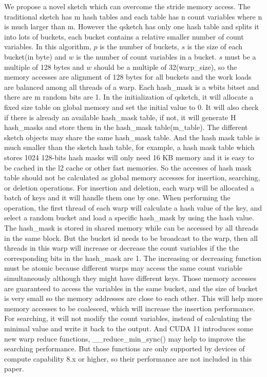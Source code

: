 \documentclass[conference]{IEEEtran}
\begin{document}
We propose a novel sketch which can overcome the stride memory access. The traditional sketch has m hash tables and each table has n count variables where n is much larger than m. However the qsketch has only one hash table and splits it into lots of buckets, each bucket contains a relative smaller number of count variables. In this algorithm, $p$ is the number of buckets, $s$ is the size of each bucket(in byte) and $w$ is the number of count variables in a bucket. $s$ must be a multiple of 128 bytes and $w$ should be a multiple of 32(warp\_size), so the memory accesses are alignment of 128 bytes for all buckets and the work loads are balanced among all threads of a warp. Each hash\_mask is a w\-bits bitset and there are m random bits are 1.
In the initialization of qsketch, it will allocate a fixed size table on global memory and set the initial value to 0. It will also check if there is already an available hash\_mask table, if not, it will generate H hash\_masks and store them in the hash\_mask table(m\_table). The different sketch objects may share the same hash\_mask table. And the hash mask table is much smaller than the sketch hash table, for example, a hash mask table which stores 1024 128-bits hash masks will only need 16 KB memory and it is easy to be cached in the l2 cache or other fast memories. So the accesses of hash mask table should not be calculated as global memory accesses for insertion, searching, or deletion operations.
For insertion and deletion, each warp will be allocated a batch of keys and it will handle them one by one. When performing the operation, the first thread of each warp will calculate a hash value of the key, and select a random bucket and load a specific hash\_mask by using the hash value. The hash\_mask is stored in shared memory while can be accessed by all threads in the same block. But the bucket id needs to be broadcast to the warp, then all threads in this warp will increase or decrease the count variables if the the corresponding bits in the hash\_mask are 1. The increasing or decreasing function must be atomic because different warps may access the same count variable simultaneously although they might have different keys. Those memory accesses are guaranteed to access the variables in the same bucket, and the size of bucket is very small so the memory addresses are close to each other. This will help more memory accesses to be coalesced, which will increase the insertion performance. 
For searching, it will not modify the count variables, instead of calculating the minimal value and write it back to the output. And CUDA 11 introduces some new warp reduce functions, \_\_reduce\_min\_sync() may help to improve the searching performance. But those functions are only supported by devices of compute capability 8.x or higher, so their performance are not included in this paper.
\end{document}
